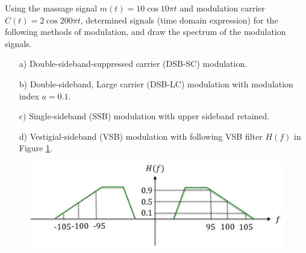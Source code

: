 \documentclass{assignment}
\begin{document}
\begin{prob}
    Using the massage signal $m(t)=10\cos 10\pi t$ and modulation carrier $C(t)=2\cos 200\pi t$, determined signals (time domain expression) for the following methods of modulation, and draw the spectrum of the modulation signals.
    \begin{itemize}
        \item[a)] Double-sideband-suppressed carrier (DSB-SC) modulation.
        \item[b)] Double-sideband, Large carrier (DSB-LC) modulation with modulation index $a=0.1$.
        \item[c)] Single-sideband (SSB) modulation with upper sideband retained.
        \item[d)] Vestigial-sideband (VSB) modulation with following VSB filter $H(f)$ in Figure \ref{Assignment-4-Problem-1}.
    \end{itemize}
    \begin{figure}[h]
        \centering
        \includegraphics[width=.5\columnwidth]{Assignment-4-Problem-1.jpg}
        \caption{}
        \label{Assignment-4-Problem-1}
    \end{figure}
\end{prob}
\end{document}
